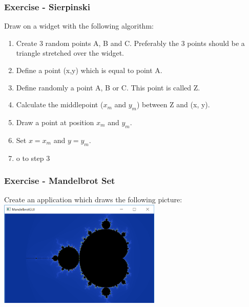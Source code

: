 \begin{frame}[fragile]
\frametitle{Exercise - Sierpinski}
Draw on a widget with the following algorithm:
{\small
\begin{enumerate}
\item Create 3 random points A, B and C. Preferably the 3 points should
be a triangle stretched over the widget.
\item Define a point (x,y) which is equal to point A.
\item Define randomly a point A, B or C. This point is called Z.
\item Calculate the middlepoint ($x_m$ and $y_m$) between Z and (x, y).
\item Draw a point at position $x_m$ and $y_m$.
\item Set $x=x_m$ and $y=y_m$.
\item o to step 3
\end{enumerate}
}
\end{frame}

\begin{frame}[fragile]
\frametitle{Exercise - Mandelbrot Set}
Create an application which draws the following picture:\\
\vspace{3mm}
\includegraphics[width=220pt]{img/Mandelbrot.png}
\end{frame}

